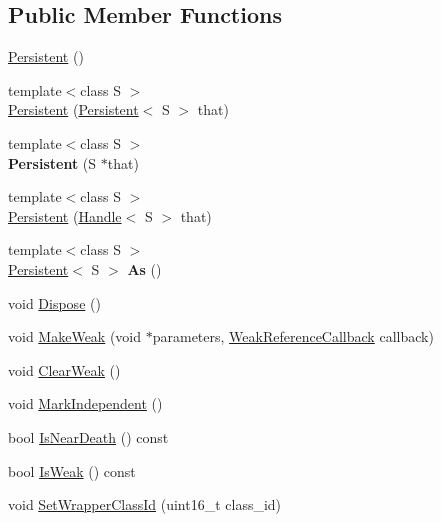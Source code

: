 \subsection*{Public Member Functions}
\begin{DoxyCompactItemize}
\item 
\hyperlink{classv8_1_1_persistent_aff7516636baaf209885220f7cff34463}{Persistent} ()
\item 
{\footnotesize template$<$class S $>$ }\\\hyperlink{classv8_1_1_persistent_aea24de4ad0e6cd8e102411e11fbc3948}{Persistent} (\hyperlink{classv8_1_1_persistent}{Persistent}$<$ S $>$ that)
\item 
\hypertarget{classv8_1_1_persistent_a8050e41b31d6fbdf967957d6f5db2205}{}{\footnotesize template$<$class S $>$ }\\{\bfseries Persistent} (S $\ast$that)\label{classv8_1_1_persistent_a8050e41b31d6fbdf967957d6f5db2205}

\item 
{\footnotesize template$<$class S $>$ }\\\hyperlink{classv8_1_1_persistent_a89b49f1b1903a2d625d5c3100238276e}{Persistent} (\hyperlink{classv8_1_1_handle}{Handle}$<$ S $>$ that)
\item 
\hypertarget{classv8_1_1_persistent_a5d30266380d9a759050aee25fbcc3c88}{}{\footnotesize template$<$class S $>$ }\\\hyperlink{classv8_1_1_persistent}{Persistent}$<$ S $>$ {\bfseries As} ()\label{classv8_1_1_persistent_a5d30266380d9a759050aee25fbcc3c88}

\item 
void \hyperlink{classv8_1_1_persistent_a33e53191844272ba0f2da4f55fc12297}{Dispose} ()
\item 
void \hyperlink{classv8_1_1_persistent_ab04609812113450bece2640ad0b27658}{Make\+Weak} (void $\ast$parameters, \hyperlink{namespacev8_a4d5db775dbc002b23f1b55ec7ce80ea5}{Weak\+Reference\+Callback} callback)
\item 
void \hyperlink{classv8_1_1_persistent_a30806c1125371c269a02ec03d47c69ab}{Clear\+Weak} ()
\item 
void \hyperlink{classv8_1_1_persistent_a2c3bc812813279b80326c8a52164a2b4}{Mark\+Independent} ()
\item 
bool \hyperlink{classv8_1_1_persistent_a1f60b982c5e734df7e4fe22ccd5b62cf}{Is\+Near\+Death} () const 
\item 
bool \hyperlink{classv8_1_1_persistent_aa636a55b81eee222f86866dd5ae8c06f}{Is\+Weak} () const 
\item 
void \hyperlink{classv8_1_1_persistent_a41c933abe7726d4c314804859ef3acae}{Set\+Wrapper\+Class\+Id} (uint16\+\_\+t class\+\_\+id)
\end{DoxyCompactItemize}
